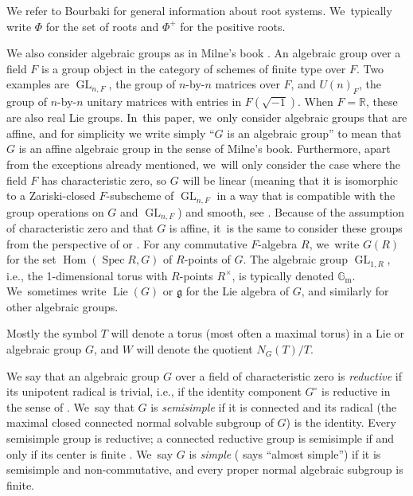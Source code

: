 \documentclass[JEP,XML,SOM,Unicode,NoFloatCountersInSection,published]{cedram}
\theoremstyle{definition}
\newcommand{\mfg}{\mathfrak{g}}
\newcommand{\R}{\mathbb{R}}
\newcommand{\Gm}{\mathbb{G}_{\mathrm{m}}}
\DeclareMathOperator{\GL}{GL}
\DeclareMathOperator{\Spec}{Spec}
\DeclareMathOperator{\Lie}{Lie}
\DeclareMathOperator{\Hom}{Hom}
\begin{document}
We refer to Bourbaki \cite[Ch.\,VI]{Bou:g4} for general information about root systems. We~typically write $\Phi$ for the set of roots and $\Phi^+$ for the positive roots.

We also consider algebraic groups as in Milne's book \cite{Milne}. An algebraic group over a field $F$ is a group object in the category of schemes of finite type over $F$. Two examples are $\GL_{n,F}$, the group of $n$-by-$n$ matrices over $F$, and $U(n)_F$, the group of $n$-by-$n$ unitary matrices with entries in $F(\sqrt{-1})$. When $F = \R$, these are also real Lie groups. In~this paper, we~only consider algebraic groups that are affine, and for simplicity we write simply ``$G$ is an algebraic group'' to mean that $G$ is an affine algebraic group in the sense of Milne's book. Furthermore, apart from the exceptions already mentioned, we~will only consider the case where the field $F$ has characteristic zero, so $G$ will be linear (meaning that it is isomorphic to a Zariski-closed $F$-subscheme of $\GL_{n,F}$ in a way that is compatible with the group operations on $G$ and $\GL_{n,F}$) and smooth, see \cite[Prop.\,1.41, Th.\,3.23, Cor.\,4.10]{Milne}. Because of the assumption of characteristic zero and that $G$ is affine, it~is the same to consider these groups from the perspective of \cite{Borel} or \cite{Sp:LAG}.
For any commutative $F$-algebra $R$, we~write $G(R)$ for the set $\Hom(\Spec R, G)$ of $R$-points of $G$. The algebraic group $\GL_{1,R}$, i.e., the 1-dimensional torus with $R$-points $R^\times$, is typically denoted $\Gm$. We~sometimes write $\Lie(G)$ or $\mfg$ for the Lie algebra of $G$, and similarly for other algebraic groups.

Mostly the symbol $T$ will denote a torus (most often a maximal torus) in a Lie or algebraic group $G$, and $W$ will denote the quotient $N_G(T)/T$.

We say that an algebraic group $G$ over a field of characteristic zero is \emph{reductive} if its unipotent radical is trivial, i.e., if the identity component $G^\circ$ is reductive in the sense of \cite[\S19c]{Milne}. We~say that $G$ is \emph{semisimple} if it is connected and its radical (the maximal closed connected normal solvable subgroup of $G$) is the identity. Every semisimple group is reductive; a connected reductive group is semisimple if and only if its center is finite \cite[Prop.\,19.10]{Milne}. We~say $G$ is \emph{simple} (\cite[Def.\,17.97]{Milne} says ``almost simple'') if it is semisimple and non-commutative, and every proper normal algebraic subgroup is finite.
\end{document}
